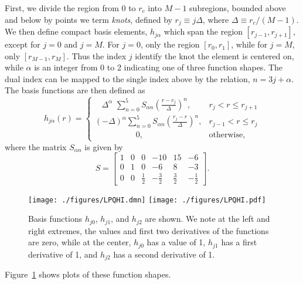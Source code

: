 First, we divide the region from 0 to $r_c$ into $M-1$ subregions,
bounded above and below by points we term {\em knots}, defined by $r_j
\equiv j\Delta$, where $\Delta \equiv r_c/(M-1)$.  We then define
compact basis elements, $h_{j\alpha}$ which span the region
$[r_{j-1},r_{j+1}]$, except for $j=0$ and $j=M$.  For $j=0$, only the
region $[r_0,r_1]$, while for $j=M$, only $[r_{M-1}, r_M]$.  Thus the
index $j$ identify the knot the element is centered on, while $\alpha$
is an integer from 0 to 2 indicating one of three function shapes.
The dual index can be mapped to the single index above by the
relation, $n = 3j + \alpha$.  The basis functions are then defined as
\begin{equation}
h_{j\alpha}(r) = 
\begin{cases}
\ \ \ \, \Delta^\alpha \, \, \sum_{n=0}^5 S_{\alpha n} 
\left( \frac{r-r_j}{\Delta}\right)^n,    & r_j < r \le r_{j+1} \\
(-\Delta)^\alpha \sum_{n=0}^5 S_{\alpha n} 
\left( \frac{r_j-r}{\Delta}\right)^n,    & r_{j-1} < r \le r_j \\
\quad\quad\quad\quad\quad 0, & \text{otherwise},
\end{cases}
\end{equation}
where the matrix $S_{\alpha n}$ is given by
\begin{equation}
S = 
\left[\begin{matrix}
1 & 0 & 0 & -10 & 15 & -6 \\
0 & 1 & 0 & -6  &  8 & -3 \\
0 & 0 & \frac{1}{2} & -\frac{3}{2} & \frac{3}{2} & -\frac{1}{2}
\end{matrix}\right].
\end{equation}
\begin{figure}
\begin{center}
  \ifdefined\HCode
  \texttt{[image: ./figures/LPQHI.dmn]}
  \else
  \texttt{[image: ./figures/LPQHI.pdf]}
  \fi
\caption{Basis functions $h_{j0}$, $h_{j1}$, and $h_{j2}$ are shown.
We note at the left and right extremes, the values and first two
derivatives of the functions are zero, while at the center, $h_{j0}$
has a value of 1, $h_{j1}$ has a first derivative of 1, and $h_{j2}$
has a second derivative of 1. }
\label{fig:LPQHI} 
\end{center}
\end{figure}
Figure~\ref{fig:LPQHI} shows plots of these function shapes.


